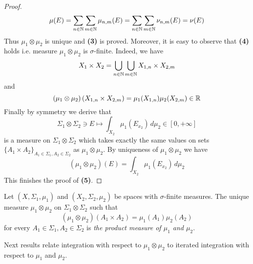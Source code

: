 \begin{proof}
    $$\mu(E) = \sum_{n\in {\mathbb N}}\sum_{m\in {\mathbb N}}\mu_{n,m}(E) = \sum_{n\in {\mathbb N}}\sum_{m\in {\mathbb N}}\nu_{n,m}(E) = \nu(E)$$
    Thus $\mu_1\otimes \mu_2$ is unique and \textbf{(3)} is proved. Moreover, it is easy to observe that \textbf{(4)} holds i.e. measure $\mu_1\otimes \mu_2$ is $\sigma$-finite. Indeed, we have
    $$X_1\times X_2 = \bigcup_{n\in {\mathbb N}}\bigcup_{m\in {\mathbb N}}X_{1,n}\times X_{2,m}$$
    and
    $$\left(\mu_1\otimes \mu_2\right)\left(X_{1,n}\times X_{2,m}\right) = \mu_1(X_{1,n})\mu_2(X_{2,m}) \in {\mathbb R}$$
    Finally by symmetry we derive that
    $$\Sigma_1\otimes \Sigma_2\ni E \mapsto \int_{X_2}\mu_1(E_{x_2})\,d\mu_2\in [0,+\infty]$$
    is a measure on $\Sigma_1\otimes \Sigma_2$ which takes exactly the same values on sets $\big\{A_1\times A_2\big\}_{A_1\in \Sigma_1,A_2\in \Sigma_2}$ as $\mu_1\otimes \mu_2$. By uniqueness of $\mu_1\otimes \mu_2$ we have
    $$(\mu_1\otimes \mu_2)(E) = \int_{X_2}\mu_1(E_{x_2})\,d\mu_2$$
    This finishes the proof of \textbf{(5)}.
\end{proof}

\begin{definition}
    Let $(X,\Sigma_1,\mu_1)$ and $(X_2,\Sigma_2,\mu_2)$ be spaces with $\sigma$-finite measures. The unique measure $\mu_1\otimes \mu_2$ on $\Sigma_1\otimes \Sigma_2$ such that
    $$\left(\mu_1\otimes \mu_2\right)\left(A_1\times A_2\right) = \mu_1(A_1)\mu_2(A_2)$$
    for every $A_1\in \Sigma_1, A_2\in \Sigma_2$ is \textit{the product measure of $\mu_1$ and $\mu_2$}.
\end{definition}
\noindent
Next results relate integration with respect to $\mu_1\otimes \mu_2$ to iterated integration with respect to $\mu_1$ and $\mu_2$.

